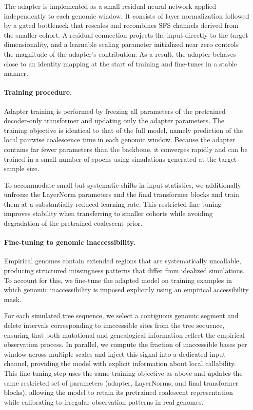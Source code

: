 \documentclass[9pt,twocolumn,twoside]{pnas-new}
\begin{document}
{The adapter is implemented as a small residual neural network applied independently
to each genomic window.
It consists of layer normalization followed by a gated bottleneck that rescales and
recombines SFS channels derived from the smaller cohort.
A residual connection projects the input directly to the target dimensionality, and
a learnable scaling parameter initialized near zero controls the magnitude of the
adapter's contribution.
As a result, the adapter behaves close to an identity mapping at the start of
training and fine-tunes in a stable manner.

\paragraph{Training procedure.}
Adapter training is performed by freezing all parameters of the pretrained
decoder-only transformer and updating only the adapter parameters.
The training objective is identical to that of the full model, namely prediction of
the local pairwise coalescence time in each genomic window.
Because the adapter contains far fewer parameters than the backbone, it converges
rapidly and can be trained in a small number of epochs using simulations generated
at the target sample size.

To accommodate small but systematic shifts in input statistics, we additionally
unfreeze the LayerNorm parameters and the final transformer blocks and train them at
a substantially reduced learning rate.
This restricted fine-tuning improves stability when transferring to smaller cohorts
while avoiding degradation of the pretrained coalescent prior.

\paragraph{Fine-tuning to genomic inaccessibility.}
Empirical genomes contain extended regions that are systematically uncallable,
producing structured missingness patterns that differ from idealized simulations.
To account for this, we fine-tune the adapted model on training examples in which
genomic inaccessibility is imposed explicitly using an empirical accessibility mask.

For each simulated tree sequence, we select a contiguous genomic segment and delete
intervals corresponding to inaccessible sites from the tree sequence, ensuring that
both mutational and genealogical information reflect the empirical observation
process.
In parallel, we compute the fraction of inaccessible bases per window across multiple
scales and inject this signal into a dedicated input channel, providing the model
with explicit information about local callability.
This fine-tuning step uses the same training objective as above and updates the same
restricted set of parameters (adapter, LayerNorms, and final transformer blocks),
allowing the model to retain its pretrained coalescent representation while
calibrating to irregular observation patterns in real genomes.


}
\end{document}
